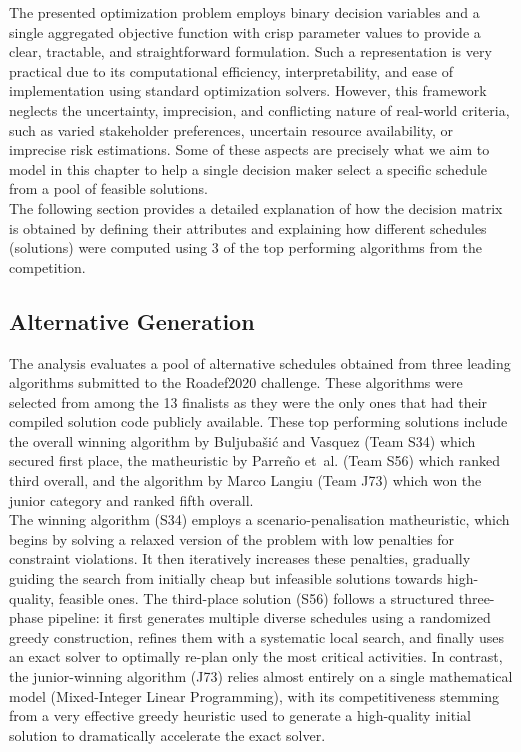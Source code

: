 The presented optimization problem employs binary decision variables and a single aggregated objective function with crisp parameter values to provide a clear, tractable, and straightforward formulation. Such a representation is very practical due to its computational efficiency, interpretability, and ease of implementation using standard optimization solvers. However, this framework neglects the uncertainty, imprecision, and conflicting nature of  real-world criteria, such as varied stakeholder preferences, uncertain resource availability, or imprecise risk estimations. Some of these aspects are precisely what we aim to model in this chapter to help a single decision maker select a specific schedule from a pool of feasible solutions. \\

The following section provides a detailed explanation of how the decision matrix is obtained by defining their attributes and explaining how different schedules (solutions) were computed using 3 of the top performing algorithms from the competition.

\subsection{Alternative Generation}

The analysis evaluates a pool of alternative schedules obtained from three leading algorithms submitted to the Roadef2020 challenge. These algorithms were selected from among the 13 finalists as they were the only ones that had their compiled solution code publicly available. These top performing solutions include the overall winning algorithm by Buljubašić and Vasquez\cite{top1} (Team S34) which secured first place, the matheuristic by Parreño et~al.\cite{ConsueloRoadef} (Team S56) which ranked third overall, and the algorithm by Marco Langiu\cite{top5} (Team J73) which won the junior category and ranked fifth overall.\\



The winning algorithm (S34) employs a scenario-penalisation matheuristic, which begins by solving a relaxed version of the problem with low penalties for constraint violations. It then iteratively increases these penalties, gradually guiding the search from initially cheap but infeasible solutions towards high-quality, feasible ones. The third-place solution (S56) follows a structured three-phase pipeline: it first generates multiple diverse schedules using a randomized greedy construction, refines them with a systematic local search, and finally uses an exact solver to optimally re-plan only the most critical activities. In contrast, the junior-winning algorithm (J73) relies almost entirely on a single mathematical model (Mixed-Integer Linear Programming), with its competitiveness stemming from a very effective greedy heuristic used to generate a high-quality initial solution to dramatically accelerate the exact solver.\\

